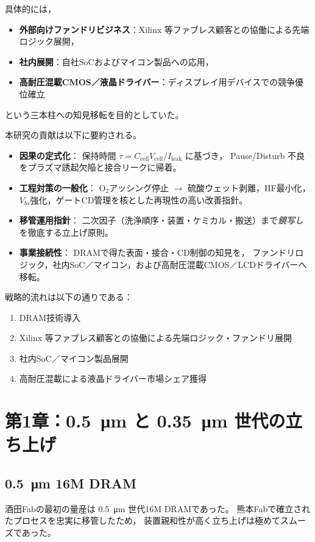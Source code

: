 \documentclass[conference]{IEEEtran}
\let\meter\metre
\begin{document}
具体的には，
\begin{itemize}
  \item \textbf{外部向けファンドリビジネス}：Xilinx 等ファブレス顧客との協働による先端ロジック展開，
  \item \textbf{社内展開}：自社SoCおよびマイコン製品への応用，
  \item \textbf{高耐圧混載CMOS／液晶ドライバー}：ディスプレイ用デバイスでの競争優位確立
\end{itemize}
という三本柱への知見移転を目的としていた。

本研究の貢献は以下に要約される。
\begin{itemize}
  \item \textbf{因果の定式化}：
    保持時間 $\tau=C_{\mathrm{cell}}V_{\mathrm{cell}}/I_{\mathrm{leak}}$ に基づき，
    Pause/Disturb 不良をプラズマ誘起欠陥と接合リークに帰着。
  \item \textbf{工程対策の一般化}：
    O$_2$アッシング停止 $\rightarrow$ 硫酸ウェット剥離，HF最小化，
    $V_{bs}$強化，ゲートCD管理を核とした再現性の高い改善指針。
  \item \textbf{移管運用指針}：
    二次因子（洗浄順序・装置・ケミカル・搬送）まで\emph{鏡写し}を徹底する立上げ原則。
  \item \textbf{事業接続性}：
    DRAMで得た表面・接合・CD制御の知見を，
    ファンドリロジック，社内SoC／マイコン，および高耐圧混載CMOS／LCDドライバーへ移転。
\end{itemize}

戦略的流れは以下の通りである：
\begin{enumerate}
  \item DRAM技術導入
  \item Xilinx 等ファブレス顧客との協働による先端ロジック・ファンドリ展開
  \item 社内SoC／マイコン製品展開
  \item 高耐圧混載による液晶ドライバー市場シェア獲得
\end{enumerate}

\section{第1章：\texorpdfstring{\SI{0.5}{\micro\meter}}{0.5μm} と \texorpdfstring{\SI{0.35}{\micro\meter}}{0.35μm} 世代の立ち上げ}

\subsection{\SI{0.5}{\micro\meter} 16M DRAM}
酒田Fabの最初の量産は \SI{0.5}{\micro\meter} 世代16M DRAMであった。
熊本Fabで確立されたプロセスを忠実に移管したため，
装置親和性が高く立ち上げは極めてスムーズであった。
\end{document}
